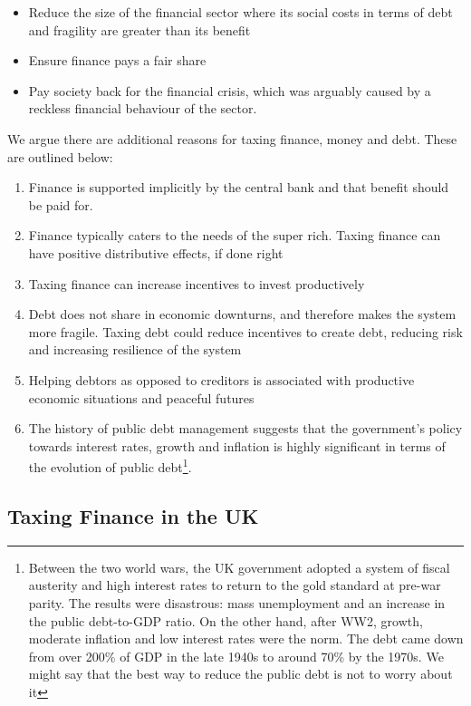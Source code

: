 \documentclass[]{tufte-handout}
\providecommand{\tightlist}{%
  \setlength{\itemsep}{0pt}\setlength{\parskip}{0pt}}
\begin{document}
\begin{itemize}
\tightlist
\item
  Reduce the size of the financial sector where its social costs in
  terms of debt and fragility are greater than its benefit
\item
  Ensure finance pays a fair share
\item
  Pay society back for the financial crisis, which was arguably caused
  by a reckless financial behaviour of the sector.
\end{itemize}

We argue there are additional reasons for taxing finance, money and
debt. These are outlined below:

\begin{enumerate}
\def\labelenumi{\arabic{enumi}.}
\tightlist
\item
  Finance is supported implicitly by the central bank and that benefit
  should be paid for.
\item
  Finance typically caters to the needs of the super rich. Taxing
  finance can have positive distributive effects, if done right
\item
  Taxing finance can increase incentives to invest productively
\item
  Debt does not share in economic downturns, and therefore makes the
  system more fragile. Taxing debt could reduce incentives to create
  debt, reducing risk and increasing resilience of the system
\item
  Helping debtors as opposed to creditors is associated with productive
  economic situations and peaceful futures
\item
  The history of public debt management suggests that the government's
  policy towards interest rates, growth and inflation is highly
  significant in terms of the evolution of public debt\footnote{Between
    the two world wars, the UK government adopted a system of fiscal
    austerity and high interest rates to return to the gold standard at
    pre-war parity. The results were disastrous: mass unemployment and
    an increase in the public debt-to-GDP ratio. On the other hand,
    after WW2, growth, moderate inflation and low interest rates were
    the norm. The debt came down from over 200\% of GDP in the late
    1940s to around 70\% by the 1970s. We might say that the best way to
    reduce the public debt is not to worry about it}.
\end{enumerate}

\hypertarget{taxing-finance-in-the-uk}{%
\subsection{Taxing Finance in the UK}\label{taxing-finance-in-the-uk}}
\end{document}
